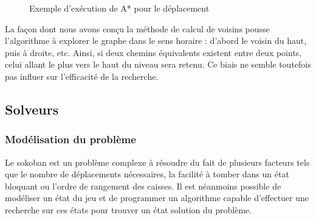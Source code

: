 \documentclass[a4paper,12pt]{article} %
\begin{document}
\begin{figure}[!h]
\centering
{}
\caption{Exemple d'exécution de A* pour le déplacement}
\end{figure}

La façon dont nous avons conçu la méthode de calcul de voisins pousse l'algorithme à explorer le graphe dans le sens horaire : d'abord le voisin du haut, puis à droite, etc. Ainsi, si deux chemins équivalents existent entre deux points, celui allant le plus vers le haut du niveau sera retenu. Ce biais ne semble toutefois pas influer sur l'efficacité de la recherche.

\subsection{Solveurs}

\subsubsection{Modélisation du problème}

Le sokoban est un problème complexe à résoudre du fait de plusieurs facteurs tels que le nombre de déplacements nécessaires, la facilité à tomber dans un état bloquant ou l'ordre de rangement des caisses. Il est néanmoins possible de modéliser un état du jeu et de programmer un algorithme capable d'effectuer une recherche sur ces états pour trouver un état solution du problème.\\
\end{document}
